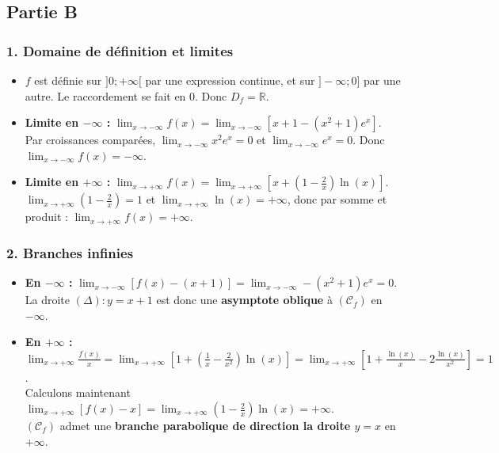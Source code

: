 \documentclass[12pt,a4paper]{article}
\begin{document}
\subsection*{Partie B}

\subsubsection*{1. Domaine de définition et limites}
\begin{itemize}
    \item $f$ est définie sur $]0; +\infty[$ par une expression continue, et sur $]-\infty; 0]$ par une autre. Le raccordement se fait en $0$. Donc $D_f = \mathbb{R}$.
    \item \textbf{Limite en $-\infty$ :} $\lim_{x \to -\infty} f(x) = \lim_{x \to -\infty} \left[ x + 1 - (x^2+1)e^x \right]$. \\
    Par croissances comparées, $\lim_{x \to -\infty} x^2e^x = 0$ et $\lim_{x \to -\infty} e^x = 0$. Donc $\lim_{x \to -\infty} f(x) = -\infty$.
    \item \textbf{Limite en $+\infty$ :} $\lim_{x \to +\infty} f(x) = \lim_{x \to +\infty} \left[ x + \left(1 - \frac{2}{x}\right)\ln(x) \right]$. \\
    $\lim_{x \to +\infty} \left(1 - \frac{2}{x}\right) = 1$ et $\lim_{x \to +\infty} \ln(x) = +\infty$, donc par somme et produit : $\lim_{x \to +\infty} f(x) = +\infty$.
\end{itemize}

\subsubsection*{2. Branches infinies}
\begin{itemize}
    \item \textbf{En $-\infty$ :} $\lim_{x \to -\infty} [f(x) - (x+1)] = \lim_{x \to -\infty} -(x^2+1)e^x = 0$. \\
    La droite $(\Delta) : y = x + 1$ est donc une \textbf{asymptote oblique} à $(\mathcal{C}_f)$ en $-\infty$.
    \item \textbf{En $+\infty$ :} $\lim_{x \to +\infty} \frac{f(x)}{x} = \lim_{x \to +\infty} \left[ 1 + \left(\frac{1}{x} - \frac{2}{x^2}\right)\ln(x) \right] = \lim_{x \to +\infty} \left[ 1 + \frac{\ln(x)}{x} - 2\frac{\ln(x)}{x^2} \right] = 1$. \\
    Calculons maintenant $\lim_{x \to +\infty} [f(x) - x] = \lim_{x \to +\infty} \left(1 - \frac{2}{x}\right)\ln(x) = +\infty$. \\
    $(\mathcal{C}_f)$ admet une \textbf{branche parabolique de direction la droite $y = x$} en $+\infty$.
\end{itemize}
\end{document}
